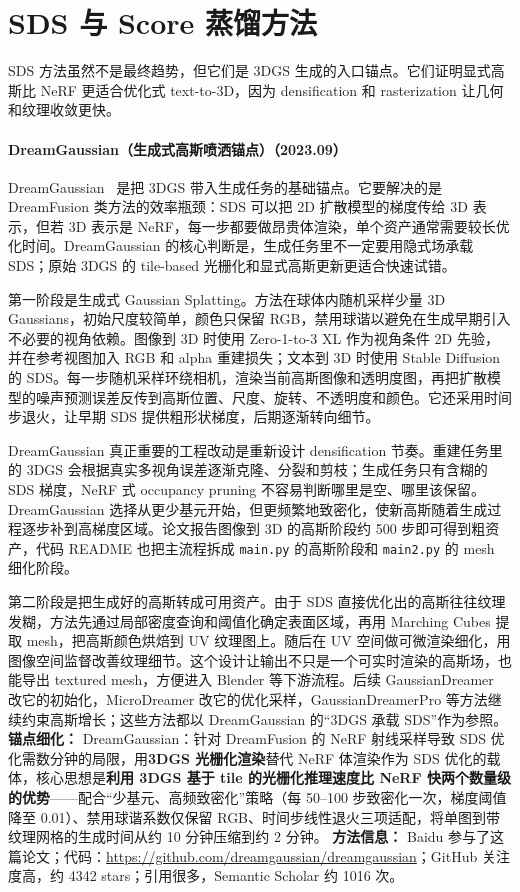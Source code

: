 \section{SDS 与 Score 蒸馏方法}

SDS 方法虽然不是最终趋势，但它们是 3DGS 生成的入口锚点。它们证明显式高斯比 NeRF 更适合优化式 text-to-3D，因为 densification 和 rasterization 让几何和纹理收敛更快。
\paragraph{DreamGaussian（生成式高斯喷洒锚点）（2023.09）}
DreamGaussian~\cite{2309_16653} 是把 3DGS 带入生成任务的基础锚点。它要解决的是 DreamFusion 类方法的效率瓶颈：SDS 可以把 2D 扩散模型的梯度传给 3D 表示，但若 3D 表示是 NeRF，每一步都要做昂贵体渲染，单个资产通常需要较长优化时间。DreamGaussian 的核心判断是，生成任务里不一定要用隐式场承载 SDS；原始 3DGS 的 tile-based 光栅化和显式高斯更新更适合快速试错。

第一阶段是生成式 Gaussian Splatting。方法在球体内随机采样少量 3D Gaussians，初始尺度较简单，颜色只保留 RGB，禁用球谐以避免在生成早期引入不必要的视角依赖。图像到 3D 时使用 Zero-1-to-3 XL 作为视角条件 2D 先验，并在参考视图加入 RGB 和 alpha 重建损失；文本到 3D 时使用 Stable Diffusion 的 SDS。每一步随机采样环绕相机，渲染当前高斯图像和透明度图，再把扩散模型的噪声预测误差反传到高斯位置、尺度、旋转、不透明度和颜色。它还采用时间步退火，让早期 SDS 提供粗形状梯度，后期逐渐转向细节。

DreamGaussian 真正重要的工程改动是重新设计 densification 节奏。重建任务里的 3DGS 会根据真实多视角误差逐渐克隆、分裂和剪枝；生成任务只有含糊的 SDS 梯度，NeRF 式 occupancy pruning 不容易判断哪里是空、哪里该保留。DreamGaussian 选择从更少基元开始，但更频繁地致密化，使新高斯随着生成过程逐步补到高梯度区域。论文报告图像到 3D 的高斯阶段约 500 步即可得到粗资产，代码 README 也把主流程拆成 \texttt{main.py} 的高斯阶段和 \texttt{main2.py} 的 mesh 细化阶段。

第二阶段是把生成好的高斯转成可用资产。由于 SDS 直接优化出的高斯往往纹理发糊，方法先通过局部密度查询和阈值化确定表面区域，再用 Marching Cubes 提取 mesh，把高斯颜色烘焙到 UV 纹理图上。随后在 UV 空间做可微渲染细化，用图像空间监督改善纹理细节。这个设计让输出不只是一个可实时渲染的高斯场，也能导出 textured mesh，方便进入 Blender 等下游流程。后续 GaussianDreamer 改它的初始化，MicroDreamer 改它的优化采样，GaussianDreamerPro 等方法继续约束高斯增长；这些方法都以 DreamGaussian 的“3DGS 承载 SDS”作为参照。
\textbf{锚点细化：} DreamGaussian：针对 DreamFusion 的 NeRF 射线采样导致 SDS 优化需数分钟的局限，用\textbf{3DGS 光栅化渲染}替代 NeRF 体渲染作为 SDS 优化的载体，核心思想是\textbf{利用 3DGS 基于 tile 的光栅化推理速度比 NeRF 快两个数量级的优势}——配合``少基元、高频致密化''策略（每 50--100 步致密化一次，梯度阈值降至 0.01）、禁用球谐系数仅保留 RGB、时间步线性退火三项适配，将单图到带纹理网格的生成时间从约 10 分钟压缩到约 2 分钟。
\textbf{方法信息：} Baidu 参与了这篇论文；代码：\url{https://github.com/dreamgaussian/dreamgaussian}；GitHub 关注度高，约 4342 stars；引用很多，Semantic Scholar 约 1016 次。



